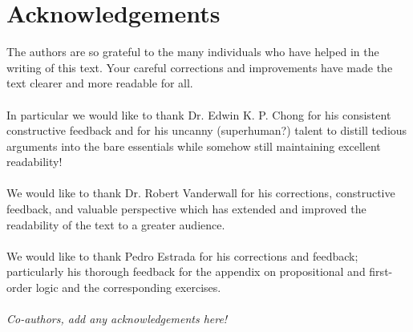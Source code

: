 \section{Acknowledgements}
The authors are so grateful to the many individuals who have helped in the writing of this text. Your careful corrections and improvements have made the text clearer and more readable for all.
 \\ \\
In particular we would like to thank Dr. Edwin K. P. Chong for his consistent constructive feedback and for his uncanny (superhuman?) talent to distill tedious arguments into the bare essentials while somehow still maintaining excellent readability! \\ \\
We would like to thank Dr. Robert Vanderwall for his corrections, constructive feedback, and valuable perspective which has extended and improved the readability of the text to a greater audience. 
\\ \\
We would like to thank Pedro Estrada for his corrections and feedback; particularly his thorough feedback for the appendix on propositional and first-order logic and the corresponding exercises. \\ \\

\textit{Co-authors, add any acknowledgements here!}